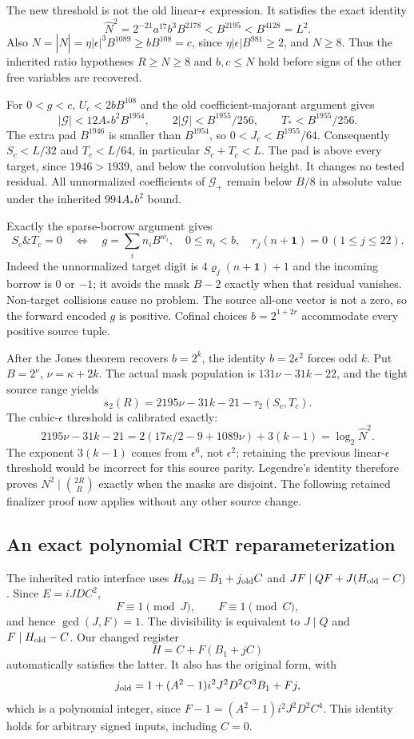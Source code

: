 The new threshold is not the old linear-$\epsilon$ expression. It satisfies the exact identity
\[
\widehat N^2=2^{-21}a^{17}b^3B^{2178}<B^{2195}<B^{4128}=L^2.
\]
Also $N=|\widehat N|=\eta|\epsilon|^3B^{1089}\ge bB^{108}=c$, since $\eta|\epsilon|B^{981}\ge2$, and $N\ge8$. Thus the inherited ratio hypotheses $R\ge N\ge8$ and $b,c\le N$ hold before signs of the other free variables are recovered.

For $0<g<c$, $U_c<2bB^{108}$ and the old coefficient-majorant argument gives
\[
|\mathcal G|<12A_*b^2B^{1954},\qquad
2|\mathcal G|<B^{1955}/256,\qquad T_*<B^{1955}/256.
\]
The extra pad $B^{1946}$ is smaller than $B^{1954}$, so $0<J_c<B^{1955}/64$. Consequently $S_c<L/32$ and $T_c<L/64$, in particular $S_c+T_c<L$. The pad is above every target, since $1946>1939$, and below the convolution height. It changes no tested residual. All unnormalized coefficients of $\mathcal G_+$ remain below $B/8$ in absolute value under the inherited $994A_*b^2$ bound.

Exactly the sparse-borrow argument gives
\[
S_c\mathbin{\&}T_c=0\quad\Longleftrightarrow\quad
 g=\sum_i n_iB^{w_i},\quad0\le n_i<b,\quad r_j(n+\mathbf1)=0\ (1\le j\le22).
\]
Indeed the unnormalized target digit is $4\varrho_j(n+\mathbf1)+1$ and the incoming borrow is $0$ or $-1$; it avoids the mask $B-2$ exactly when that residual vanishes. Non-target collisions cause no problem. The source all-one vector is not a zero, so the forward encoded $g$ is positive. Cofinal choices $b=2^{1+2r}$ accommodate every positive source tuple.

After the Jones theorem recovers $b=2^k$, the identity $b=2\epsilon^2$ forces odd $k$. Put $B=2^\nu$, $\nu=\kappa+2k$. The actual mask population is $131\nu-31k-22$, and the tight source range yields
\[
s_2(R)=2195\nu-31k-21-\tau_2(S_c,T_c).
\]
The cubic-$\epsilon$ threshold is calibrated exactly:
\[
2195\nu-31k-21
=2(17\kappa/2-9+1089\nu)+3(k-1)
=\log_2\widehat N^2.
\]
The exponent $3(k-1)$ comes from $\epsilon^6$, not $\epsilon^2$; retaining the previous linear-$\epsilon$ threshold would be incorrect for this source parity. Legendre's identity therefore proves $N^2\mid\binom{2R}{R}$ exactly when the masks are disjoint. The following retained finalizer proof now applies without any other source change.

\subsection{An exact polynomial CRT reparameterization}
The inherited ratio interface uses $H_{\rm old}=B_1+j_{\rm old}C$ and
$JF\mid QF+J(H_{\rm old}-C)$. Since $E=iJDC^2$,
\[
 F\equiv1\pmod J,\qquad F\equiv1\pmod C,
\]
and hence $\gcd(J,F)=1$. The divisibility is equivalent to
$J\mid Q$ and $F\mid H_{\rm old}-C$. Our changed register
\[
 H=C+F(B_1+jC)
\]
automatically satisfies the latter. It also has the original form, with
\[
 j_{\rm old}=1+(A^2-1)i^2J^2D^2C^3B_1+Fj,
\]
which is a polynomial integer, since $F-1=(A^2-1)i^2J^2D^2C^4$.
This identity holds for arbitrary signed inputs, including $C=0$.

